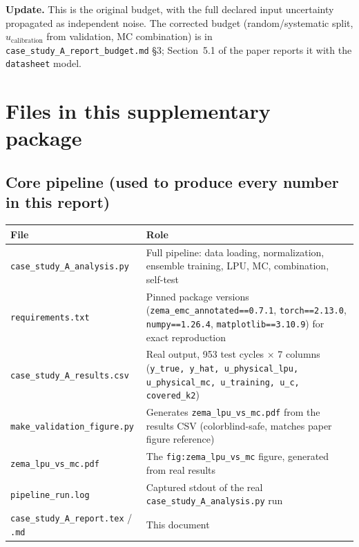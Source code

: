 \documentclass[11pt]{article}
\begin{document}
\medskip\noindent\textbf{Update.} This is the original budget, with the full
declared input uncertainty propagated as independent noise. The corrected
budget (random/systematic split, $u_{\mathrm{calibration}}$ from validation, MC
combination) is in
\texttt{case\_\allowbreak study\_\allowbreak A\_\allowbreak report\_\allowbreak budget.md}
\S3; Section~5.1 of the paper reports it with the \texttt{datasheet} model.

\section{Files in this supplementary package}
\label{sec:files}

\subsection*{Core pipeline (used to produce every number in this report)}

\begin{center}
\begin{tabular}{@{}p{4.3cm}p{9.2cm}@{}}
\toprule
File & Role \\
\midrule
\texttt{case\_\allowbreak study\_\allowbreak A\_\allowbreak analysis.py} & Full pipeline: data loading,
normalization, ensemble training, LPU, MC, combination, self-test \\
\texttt{requirements.txt} & Pinned package versions
(\texttt{zema\_\allowbreak emc\_\allowbreak annotated==0.7.1}, \texttt{torch==2.13.0},
\texttt{numpy==1.26.4}, \texttt{matplotlib==3.10.9}) for exact reproduction \\
\texttt{case\_\allowbreak study\_\allowbreak A\_\allowbreak results.csv} & Real output, 953 test cycles
$\times$ 7 columns (\texttt{y\_true, y\_hat, u\_\allowbreak physical\_\allowbreak lpu, u\_\allowbreak physical\_\allowbreak mc, u\_\allowbreak training,
u\_c, covered\_k2}) \\
\texttt{make\_\allowbreak validation\_\allowbreak figure.py} & Generates
\texttt{zema\_\allowbreak lpu\_\allowbreak vs\_\allowbreak mc.pdf} from the results CSV (colorblind-safe,
matches paper figure reference) \\
\texttt{zema\_\allowbreak lpu\_\allowbreak vs\_\allowbreak mc.pdf} & The \texttt{fig:zema\_lpu\_vs\_mc} figure,
generated from real results \\
\texttt{pipeline\_run.log} & Captured stdout of the real
\texttt{case\_\allowbreak study\_\allowbreak A\_\allowbreak analysis.py} run \\
\texttt{case\_\allowbreak study\_\allowbreak A\_\allowbreak report.tex} / \texttt{.md} & This document \\
\bottomrule
\end{tabular}
\end{center}
\end{document}
